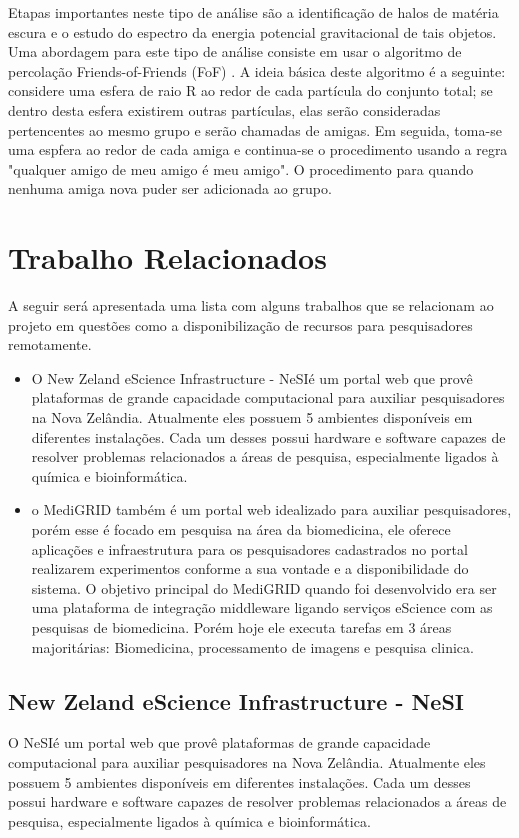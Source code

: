 \documentclass[tg]{mdtufsm}
\begin{document}
Etapas importantes neste tipo de análise são a identificação de halos de matéria escura e o estudo do espectro da
energia potencial gravitacional de tais objetos. Uma abordagem para este tipo de análise consiste em usar o
algoritmo de percolação Friends-of-Friends (FoF) \cite{uchra} . A ideia básica deste algoritmo é a seguinte: considere uma
esfera de raio R ao redor de cada partícula do conjunto total; se dentro desta esfera existirem outras partículas, elas
serão consideradas pertencentes ao mesmo grupo e serão chamadas de amigas. Em seguida, toma-se uma espfera ao
redor de cada amiga e continua-se o procedimento usando a regra "qualquer amigo de meu amigo é meu amigo". O
procedimento para quando nenhuma amiga nova puder ser adicionada ao grupo.

\fi

\section{Trabalho Relacionados}
A seguir será apresentada uma lista com alguns trabalhos que se relacionam ao projeto em questões como a disponibilização de recursos para pesquisadores remotamente.
\begin{itemize}
	\item O New Zeland eScience Infrastructure - NeSI\cite{nesi}é um portal web que  provê plataformas de grande capacidade computacional para auxiliar pesquisadores na Nova Zelândia. Atualmente eles possuem 5 ambientes disponíveis em diferentes instalações. Cada um desses possui  hardware e software capazes de resolver problemas relacionados a áreas de pesquisa, especialmente ligados à química e bioinformática. 
	
	\item  o MediGRID \cite{medigrid} também é um portal web idealizado para auxiliar pesquisadores, porém esse é focado em pesquisa na área da biomedicina, ele oferece aplicações e infraestrutura para os pesquisadores cadastrados no portal realizarem experimentos conforme a sua vontade e a disponibilidade do sistema. 
	O objetivo principal do MediGRID quando foi desenvolvido era ser uma plataforma de integração middleware ligando serviços eScience com as pesquisas de biomedicina. Porém hoje ele executa tarefas em 3 áreas majoritárias: Biomedicina, processamento de imagens e pesquisa clinica. 
\end{itemize}

\iffalse
\subsection{New Zeland eScience Infrastructure - NeSI}
O NeSI\cite{nesi}é um portal web que  provê plataformas de grande capacidade computacional para auxiliar pesquisadores na Nova Zelândia. Atualmente eles possuem 5 ambientes disponíveis em diferentes instalações. Cada um desses possui  hardware e software capazes de resolver problemas relacionados a áreas de pesquisa, especialmente ligados à química e bioinformática. 
\end{document}
